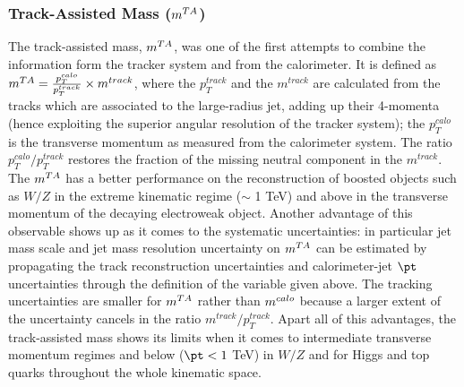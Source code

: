 \subsubsection{Track-Assisted Mass ($m^{TA}$)}
The track-assisted mass, $m^{TA}$, was one of the first attempts to combine the information form the tracker system and from the calorimeter. It is defined as $m^{TA}=\frac{p_T^{calo}}{p_T^{track}}\times m^{track}$, where the $p_T^{track}$ and the $m^{track}$ are calculated from the tracks which are associated to the large-radius jet, adding up their 4-momenta (hence exploiting the superior angular resolution of the tracker system); the $p_T^{calo}$ is the transverse momentum as measured from the calorimeter system. The ratio $p_T^{calo}/p_T^{track}$ restores the fraction of the missing neutral component in the $m^{track}$.
The $m^{TA}$ has a better performance on the reconstruction of boosted objects such as $W/Z$ in the extreme kinematic regime ($\sim $ 1 TeV) and above in the transverse momentum of the decaying electroweak object. Another advantage of this observable shows up as it comes to the systematic uncertainties: in particular jet mass scale and jet mass resolution uncertainty on $m^{TA}$ can be estimated by propagating the track reconstruction uncertainties and calorimeter-jet $\pt$ uncertainties through the definition of the variable given above. The tracking uncertainties are smaller for $m^{TA}$ rather than $m^{calo}$ because a larger extent of the uncertainty cancels in the ratio $m^{track}/p_T^{track}$.
Apart all of this advantages, the track-assisted mass shows its limits when it comes to intermediate transverse momentum regimes and below ($\pt < 1 $ TeV) in $W/Z$ and for Higgs and top quarks throughout the whole kinematic space.

